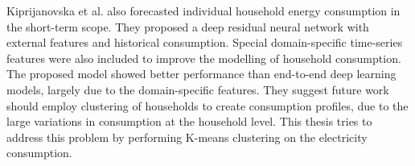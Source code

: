 Kiprijanovska et al. \cite{kiprijanovska_houseec_2020} also forecasted individual household energy consumption in the short-term scope. They proposed a deep residual neural network with external features and historical consumption. Special domain-specific time-series features were also included to improve the modelling of household consumption. The proposed model showed better performance than end-to-end deep learning models, largely due to the domain-specific features. They suggest future work should employ clustering of households to create consumption profiles, due to the large variations in consumption at the household level. This thesis tries to address this problem by performing K-means clustering on the electricity consumption.
